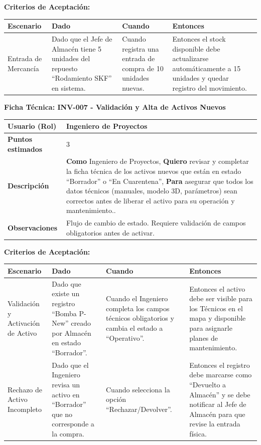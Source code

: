 \noindent
\textbf{Criterios de Aceptación:}
\footnotesize
\begin{longtable}{|p{}|p{}|p{}|p{}|}
\hline
\textbf{Escenario} & \textbf{Dado} & \textbf{Cuando} & \textbf{Entonces} \\ \hline
\endhead
Entrada de Mercancía & Dado que el Jefe de Almacén tiene 5 unidades del repuesto ``Rodamiento SKF'' en sistema. & Cuando registra una entrada de compra de 10 unidades nuevas. & Entonces el stock disponible debe actualizarse automáticamente a 15 unidades y quedar registro del movimiento. \\ \hline
\end{longtable}
\normalsize

\noindent
\textbf{Ficha Técnica: INV-007 - Validación y Alta de Activos Nuevos}
\footnotesize
\begin{longtable}{|p{}|p{}|}
\hline
\textbf{Usuario (Rol)} & Ingeniero de Proyectos \\ \hline
\textbf{Puntos estimados} & 3 \\ \hline
\textbf{Descripción} & \textbf{Como} Ingeniero de Proyectos, \textbf{Quiero} revisar y completar la ficha técnica de los activos nuevos que están en estado ``Borrador'' o ``En Cuarentena'', \textbf{Para} asegurar que todos los datos técnicos (manuales, modelo 3D, parámetros) sean correctos antes de liberar el activo para su operación y mantenimiento.. \\ \hline
\textbf{Observaciones} & Flujo de cambio de estado. Requiere validación de campos obligatorios antes de activar. \\ \hline
\end{longtable}
\normalsize

\noindent
\textbf{Criterios de Aceptación:}
\footnotesize
\begin{longtable}{|p{}|p{}|p{}|p{}|}
\hline
\textbf{Escenario} & \textbf{Dado} & \textbf{Cuando} & \textbf{Entonces} \\ \hline
\endhead
Validación y Activación de Activo & Dado que existe un registro ``Bomba P-New'' creado por Almacén en estado ``Borrador''. & Cuando el Ingeniero completa los campos técnicos obligatorios y cambia el estado a ``Operativo''. & Entonces el activo debe ser visible para los Técnicos en el mapa y disponible para asignarle planes de mantenimiento. \\ \hline
Rechazo de Activo Incompleto & Dado que el Ingeniero revisa un activo en ``Borrador'' que no corresponde a la compra. & Cuando selecciona la opción ``Rechazar/Devolver''. & Entonces el registro debe marcarse como ``Devuelto a Almacén'' y se debe notificar al Jefe de Almacén para que revise la entrada física. \\ \hline
\end{longtable}
\normalsize

